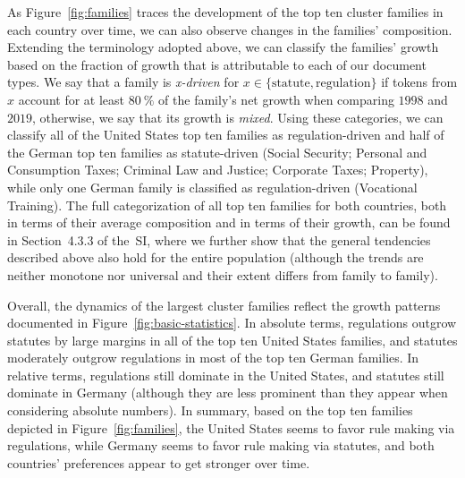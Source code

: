 \documentclass[utf8,sort&compress,table,hidelinks]{frontiersFPHY} %
\newcommand{\thesi}{SI\xspace}
\begin{document}
As Figure~\ref{fig:families} traces the development of the top ten cluster families in each country over time, we can also observe changes in the families' composition.
Extending the terminology adopted above, we can classify the families' growth based on the fraction of growth that is attributable to each of our document types. 
We say that a family is \emph{x-driven} for $x\in \{\text{statute}, \text{regulation}\}$ if tokens from $x$ account for at least $80~\%$ of the family's net growth when comparing $1998$ and $2019$, otherwise, we say that its growth is \emph{mixed}. 
Using these categories, we can classify all of the United States top ten families as regulation-driven
and half of the German top ten families as statute-driven (Social Security; Personal and Consumption Taxes; Criminal Law and Justice; Corporate Taxes; Property), while only one German family is classified as regulation-driven (Vocational Training). 
The full categorization of all top ten families for both countries, both in terms of their average composition and in terms of their growth, can be found in Section~4.3.3 of the~\thesi, 
where we further show that the general tendencies described above also hold for the entire population (although the trends are neither monotone nor universal and their extent differs from family to family).

Overall, the dynamics of the largest cluster families reflect the growth patterns documented in Figure~\ref{fig:basic-statistics}.
In absolute terms, regulations outgrow statutes by large margins in all of the top ten United States families, and statutes moderately outgrow regulations in most of the top ten German families. 
In relative terms, regulations still dominate in the United States, 
and statutes still dominate in Germany (although they are less prominent than they appear when considering absolute numbers).
In summary, based on the top ten families depicted in Figure~\ref{fig:families}, the United States seems to favor rule making via regulations, while Germany seems to favor rule making via statutes, and both countries' preferences appear to get stronger over time.
\end{document}
